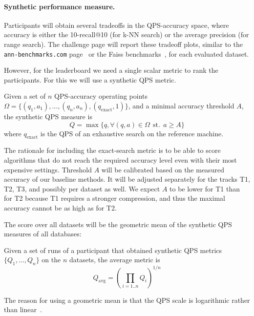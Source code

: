 

\paragraph{Synthetic performance measure.}


Participants will obtain several tradeoffs in the QPS-accuracy space,
where accuracy is either the 10-recall@10 (for k-NN search) or the
average precision (for range search).  The challenge page will report
these tradeoff plots, similar to the {\tt ann-benchmarks.com}
page~\cite{Benchmark} or the Faiss benchmarks~\cite{FaissBenchmarks},
for each evaluated dataset.

However, for the leaderboard we need a single scalar metric to rank the participants. 
For this we will use a synthetic QPS metric. 

\begin{definition}
  \label{def:syntheticmetric}
  Given a set of $n$ QPS-accuracy operating points $\Omega = \{(q_1, a_1), ..., (q_n, a_n), (q_\mathrm{exact}, 1)\}$, 
  and a minimal accuracy threshold $A$,   the synthetic QPS measure is 
  \[
Q =  \max \{ q, \forall (q, a)\in \Omega \ \ \mathrm{st.}\ \  a\ge A \}
  \]
  where $q_\mathrm{exact}$ is the QPS of an exhaustive search on the reference machine.
\end{definition}


The rationale for including the exact-search metric is to be able to score algorithms that do not reach the required accuracy level even with their most expensive settings.
Threshold $A$ will be calibrated based on the measured accuracy of our baseline methods. 
It will be adjusted separately for the tracks T1, T2, T3, and possibly per dataset as well. 
We expect $A$ to be lower for T1 than for T2 because T1 requires a stronger compression, and thus the maximal accuracy cannot be as high as for T2.


The score over all datasets will be the geometric mean of the synthetic QPS measures of all databases:
\begin{definition}
  \label{def:averagedmetric}
  Given a set of runs of a participant that obtained synthetic QPS metrics $\{Q_1,...,Q_n\}$ on the $n$ datasets, the average metric is 
  \[
  Q_\mathrm{avg} = \left( 
\prod_{i=1..n} Q_i
  \right)^{1/n} 
  \]
\end{definition}
% 
The reason for using a geometric mean is that the QPS scale is logarithmic rather than linear~\cite{Benchmark,FaissBenchmarks}.



